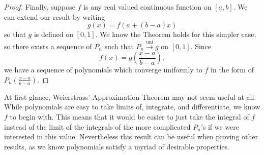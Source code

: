\documentclass{article}
\newcommand{\uni}{\overset{\text{uni}}{\to}}
\theoremstyle{definition}
\begin{document}
\begin{proof}
Finally, suppose $ f $ is any real valued continuous function on $ [a,b] $. We can extend our result by writing $$g(x)=f(a+(b-a)x)$$ so that $ g $ is defined on $ [0,1] $.  We know the Theorem holds for this simpler case, so there exists a sequence of $ P_n $ such that $ P_n\uni g $ on $ [0,1] $. Since $$f(x)=g\left(\frac{x-a}{b-a}\right) ,$$ we have a sequence of polynomials which converge uniformly to $ f $ in the form of $ P_n\left(\frac{x-a}{b-a}\right).$

\end{proof}
At first glance, Weierstrass' Approximation Theorem may not seem useful at all. While polynomials are easy to take limits of, integrate, and differentiate, we know $ f $ to begin with. This means that it would be easier to just take the integral of $ f $ instead of the limit of the integrals of the more complicated $ P_n $'s if we were interested in this value.  Nevertheless this result can be useful when proving other results, as we know polynomials satisfy a myriad of desirable properties. 
\end{document}
